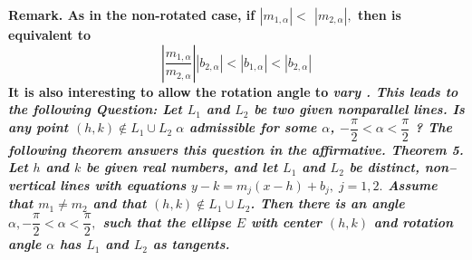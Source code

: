 \bf Remark. \rm As in the non-rotated case, if $\left| m_{1,\alpha }\right| <$ $\left| m_{2,\alpha }\right| ,$ then   is equivalent to $$\left| \dfrac{m_{1,\alpha }}{m_{2,\alpha }}\right| \left| b_{2,\alpha }\right| <\left| b_{1,\alpha }\right| <\left| b_{2,\alpha }\right| \tag{18}$$ It is also interesting to allow the rotation angle to \it vary \rm. This leads to the following \newline \bf Question: \rm Let $L_{1}$ and $L_{2}$ be two given nonparallel lines. 
Is any point $(h,k)\notin L_{1}\cup L_{2}\;\alpha $ admissible for some $\alpha $, $-\dfrac{\pi }{2}<\alpha <\dfrac{\pi }{2}$ ? The following theorem answers this question in the affirmative. \nl \nl
\bf Theorem 5. \rm  Let $h$ and $k$ be given real numbers, and let $L_{1}$ and $L_{2}$ be distinct, non--vertical lines with equations $y-k=m_{j}(x-h)+b_{j},\;j=1,2.$ Assume that $m_{1}\neq m_{2}$ and that $(h,k)\notin L_{1}\cup L_{2}$. Then there is an angle $\alpha ,-\dfrac{\pi }{2}<\alpha <\dfrac{\pi }{2},$ such that the ellipse $E$ with center $(h,k)$ and rotation angle $\alpha $ has $L_{1}$ and $L_{2}$ as tangents. \nl 
